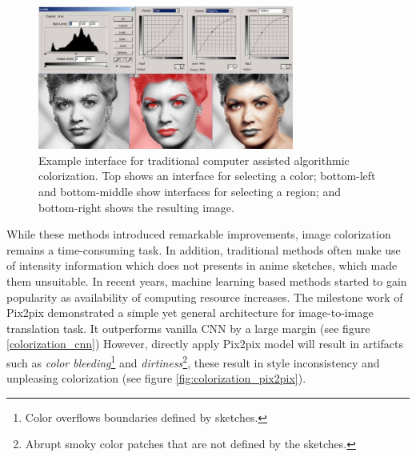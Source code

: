 \begin{figure}
    \centering
    \includegraphics[width=0.75\textwidth]{images/colorization/computer_assisted_colorization.jpg}
    \caption{Example interface for traditional computer assisted algorithmic colorization. Top shows an interface for selecting a color; bottom-left and bottom-middle show interfaces for selecting a region; and bottom-right shows the resulting image.\cite{ColorizeBlackWhite}}
    \label{fig:computer_assisted_colorization}
\end{figure}

While these methods introduced remarkable improvements, image colorization remains a time-consuming task. In addition, traditional methods often make use of intensity information which does not presents in anime sketches, which made them unsuitable. In recent years, machine learning based methods started to gain popularity as availability of computing resource increases. The milestone work of Pix2pix\cite{isolaImagetoImageTranslationConditional2018} demonstrated a simple yet general architecture for image-to-image translation task. It outperforms vanilla CNN by a large margin (see figure \ref{colorization_cnn}) However, directly apply Pix2pix model will result in artifacts such as \textit{color bleeding}\footnote{Color overflows boundaries defined by sketches.} and \textit{dirtiness}\footnote{Abrupt smoky color patches that are not defined by the sketches.}, these result in style inconsistency and unpleasing colorization (see figure \ref{fig:colorization_pix2pix}). 

